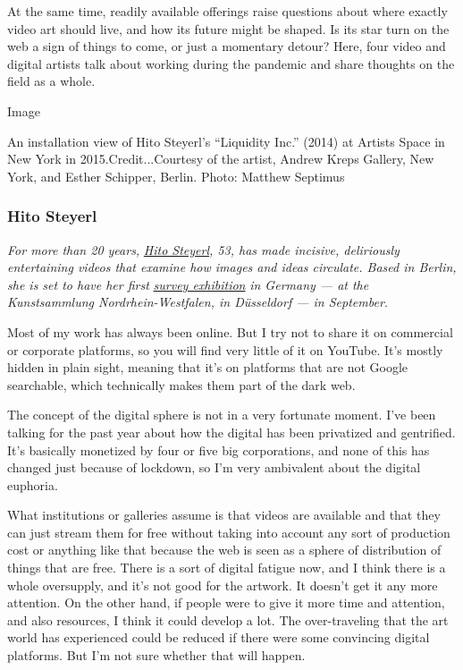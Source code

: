 At the same time, readily available offerings raise questions about
where exactly video art should live, and how its future might be shaped.
Is its star turn on the web a sign of things to come, or just a
momentary detour? Here, four video and digital artists talk about
working during the pandemic and share thoughts on the field as a whole.

Image

An installation view of Hito Steyerl's ``Liquidity Inc.'' (2014) at
Artists Space in New York in 2015.Credit...Courtesy of the artist,
Andrew Kreps Gallery, New York, and Esther Schipper, Berlin. Photo:
Matthew Septimus

\hypertarget{hito-steyerl}{%
\subsubsection{\texorpdfstring{\textbf{Hito
Steyerl}}{Hito Steyerl}}\label{hito-steyerl}}

\emph{For more than 20 years,}
\href{https://www.nytimes.com/2017/12/15/arts/design/hito-steyerl.html}{\emph{Hito
Steyerl}}\emph{, 53, has made incisive, deliriously entertaining videos
that examine how images and ideas circulate. Based in Berlin, she is set
to have her first}
\href{https://www.kunstsammlung.de/de/exhibitions/hito-steyerl}{\emph{survey
exhibition}} \emph{in Germany --- at the Kunstsammlung
Nordrhein-Westfalen, in Düsseldorf --- in September.}

Most of my work has always been online. But I try not to share it on
commercial or corporate platforms, so you will find very little of it on
YouTube. It's mostly hidden in plain sight, meaning that it's on
platforms that are not Google searchable, which technically makes them
part of the dark web.

The concept of the digital sphere is not in a very fortunate moment.
I've been talking for the past year about how the digital has been
privatized and gentrified. It's basically monetized by four or five big
corporations, and none of this has changed just because of lockdown, so
I'm very ambivalent about the digital euphoria.

What institutions or galleries assume is that videos are available and
that they can just stream them for free without taking into account any
sort of production cost or anything like that because the web is seen as
a sphere of distribution of things that are free. There is a sort of
digital fatigue now, and I think there is a whole oversupply, and it's
not good for the artwork. It doesn't get it any more attention. On the
other hand, if people were to give it more time and attention, and also
resources, I think it could develop a lot. The over-traveling that the
art world has experienced could be reduced if there were some convincing
digital platforms. But I'm not sure whether that will happen.

